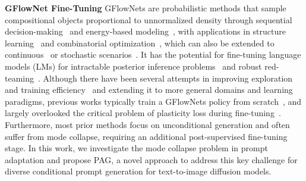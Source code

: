 \vspace{5pt}
\noindent\textbf{GFlowNet Fine-Tuning}
GFlowNets are probabilistic methods that sample compositional objects proportional to unnormalized density through sequential decision-making~\citep{bengio2021flow, bengio2023gflownet} and energy-based modeling~\citep{zhang2022generative}, with applications in structure learning~\citep{deleu2022bayesian} and combinatorial optimization~\citep{zhangrobust,Zhang2023LetTF}, which can also be extended to continuous~\citep{lahlou2023cgfn} or stochastic scenarios~\citep{pan2023stochastic,zhang2023distributional}.
It has the potential for fine-tuning language models (LMs) for intractable posterior inference problems~\citep{huamortizing} and robust red-teaming~\citep{lee2024learning}.
Although there have been several attempts in improving exploration and training efficiency~\citep{pan2023generative, kimlocal, lau2024qgfn} and extending it to more general domains and learning paradigms, previous works typically train a GFlowNets policy from scratch~\citep{pan2024pre,he2024looking}, and largely overlooked the critical problem of plasticity loss during fine-tuning~\citep{zhang2024improving,liu2024efficientdiversitypreservingdiffusionalignment}.
Furthermore, most prior methods focus on unconditional generation and often suffer from mode collapse, requiring an additional post-supervised fine-tuning stage. 
In this work, we investigate the mode collapse problem in prompt adaptation and propose PAG, a novel approach to address this key challenge for diverse conditional prompt generation for text-to-image diffusion models.